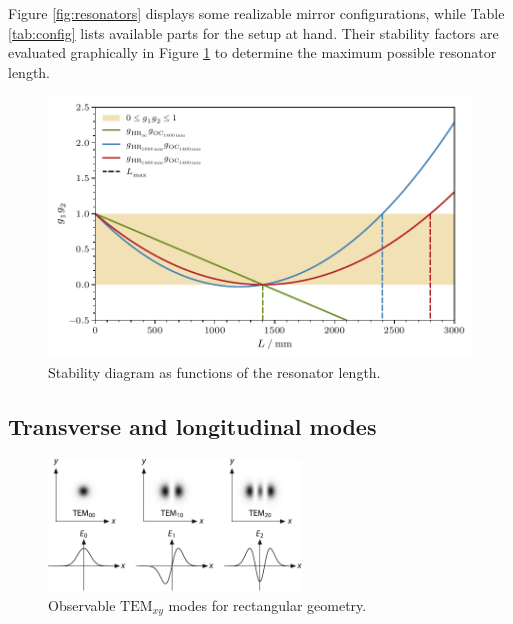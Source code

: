 Figure \ref{fig:resonators} displays some realizable mirror configurations, while Table \ref{tab:config} lists available parts for the
setup at hand. Their stability factors are evaluated graphically in Figure \ref{fig:stability} to determine the maximum possible resonator
length.

\begin{figure}[H]
	\centering
	\includegraphics{build/stability.pdf}
	\caption{Stability diagram as functions of the resonator length.}
	\label{fig:stability}
\end{figure}



\subsection{Transverse and longitudinal modes}

\begin{figure}[H]
	\centering
	\includegraphics[width=0.60\textwidth]{content/graphics/modes.pdf}
	\caption{Observable $\text{TEM}_{xy}$ modes for rectangular geometry. \cite{Eichler_2018}}
	\label{fig:modes}
\end{figure}

% 



